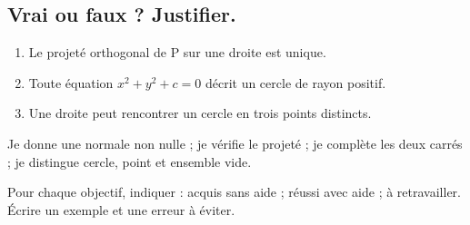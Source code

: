 \subsection*{Vrai ou faux ? Justifier.}\label{C07-VF}
\begin{enumerate}
\item Le projeté orthogonal de P sur une droite est unique.
\item Toute équation $x^2+y^2+c=0$ décrit un cercle de rayon positif.
\item Une droite peut rencontrer un cercle en trois points distincts.
\end{enumerate}
\begin{keypoint}Je donne une normale non nulle ; je vérifie le projeté ; je complète les deux carrés ; je distingue cercle, point et ensemble vide.

Pour chaque objectif, indiquer : acquis sans aide ; réussi avec aide ; à retravailler. Écrire un exemple et une erreur à éviter.\end{keypoint}
\endgroup
\ifmxteacher{}\fi
